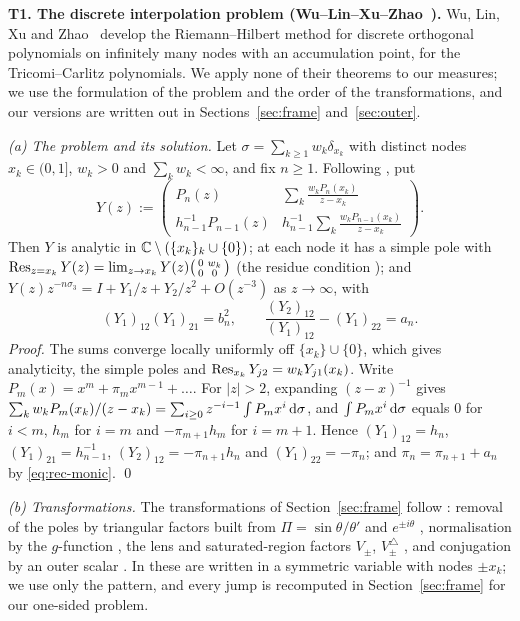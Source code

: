\medskip
\noindent\textbf{T1. The discrete interpolation problem
(Wu--Lin--Xu--Zhao~\cite{WLXZ}).}
Wu, Lin, Xu and Zhao~\cite{WLXZ} develop the Riemann--Hilbert method for discrete orthogonal polynomials on infinitely
many nodes with an accumulation point, for the Tricomi--Carlitz polynomials. We apply none of their theorems to our
measures; we use the formulation of the problem and the order of the transformations, and our versions are written out
in Sections~\ref{sec:frame} and~\ref{sec:outer}.

\emph{(a) The problem and its solution.} Let $\sigma=\sum_{k\ge1}w_k\delta_{x_k}$ with distinct nodes
$x_k\in(0,1]$, $w_k>0$ and $\sum_kw_k<\infty$, and fix $n\ge1$. Following \cite[(2.14) and Theorem~2.3]{WLXZ}, put
\begin{equation}\label{eq:Y-solution}
  Y(z):=\begin{pmatrix}P_n(z) & \displaystyle\sum_k\frac{w_kP_n(x_k)}{z-x_k}\\[3mm]
  h_{n-1}^{-1}P_{n-1}(z) & \displaystyle h_{n-1}^{-1}\sum_k\frac{w_kP_{n-1}(x_k)}{z-x_k}\end{pmatrix}.
\end{equation}
Then $Y$ is analytic in $\mathbb{C}\setminus(\{x_k\}_k\cup\{0\})$; at each node it has a simple pole with
$\operatorname*{Res}_{z=x_k}Y(z)=\lim_{z\to x_k}Y(z)\bigl(\begin{smallmatrix}0&w_k\\0&0\end{smallmatrix}\bigr)$ (the residue
condition \cite[(2.14)]{WLXZ}); and $Y(z)z^{-n\sigma_3}=I+Y_1/z+Y_2/z^2+O(z^{-3})$ as $z\to\infty$, with
\begin{equation}\label{eq:Y-extract}
  (Y_1)_{12}(Y_1)_{21}=b_n^2,\qquad \frac{(Y_2)_{12}}{(Y_1)_{12}}-(Y_1)_{22}=a_n .
\end{equation}
\emph{Proof.} The sums converge locally uniformly off $\{x_k\}\cup\{0\}$, which gives analyticity, the simple poles and
$\operatorname*{Res}_{x_k}Y_{j2}=w_kY_{j1}(x_k)$. Write $P_m(x)=x^m+\pi_mx^{m-1}+\dots$. For $|z|>2$, expanding $(z-x)^{-1}$ gives
$\sum_kw_kP_m(x_k)/(z-x_k)=\sum_{i\ge0}z^{-i-1}\int P_mx^i\,\mathrm{d}\sigma$, and $\int P_mx^i\,\mathrm{d}\sigma$ equals $0$ for $i<m$,
$h_m$ for $i=m$ and $-\pi_{m+1}h_m$ for $i=m+1$. Hence $(Y_1)_{12}=h_n$, $(Y_1)_{21}=h_{n-1}^{-1}$,
$(Y_2)_{12}=-\pi_{n+1}h_n$ and $(Y_1)_{22}=-\pi_n$; and $\pi_n=\pi_{n+1}+a_n$ by \eqref{eq:rec-monic}. \qed

\emph{(b) Transformations.} The transformations of Section~\ref{sec:frame} follow \cite[\S\S3--5]{WLXZ}: removal of the
poles by triangular factors built from $\Pi=\sin\theta/\theta'$ and $e^{\pm i\theta}$ \cite[(3.9)--(3.15)]{WLXZ},
normalisation by the $g$-function \cite[(4.1)]{WLXZ}, the lens and saturated-region factors $V_\pm$, $V^\triangle_\pm$
\cite[(4.12)--(4.13)]{WLXZ}, and conjugation by an outer scalar \cite[(5.1)]{WLXZ}. In \cite{WLXZ} these are written in
a symmetric variable with nodes $\pm x_k$; we use only the pattern, and every jump is recomputed in
Section~\ref{sec:frame} for our one-sided problem.

